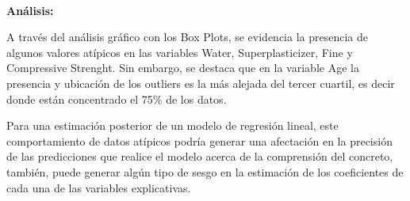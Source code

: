 \documentclass[11pt]{article}
\begin{document}
    \begin{center}
    \end{center}
    { \hspace*{\fill} \\}
    
    \textbf{Análisis:}

A través del análisis gráfico con los Box Plots, se evidencia la
presencia de algunos valores atípicos en las variables Water,
Superplasticizer, Fine y Compressive Strenght. Sin embargo, se destaca
que en la variable Age la presencia y ubicación de los outliers es la
más alejada del tercer cuartil, es decir donde están concentrado el 75\%
de los datos.

Para una estimación posterior de un modelo de regresión lineal, este
comportamiento de datos atípicos podría generar una afectación en la
precisión de las predicciones que realice el modelo acerca de la
comprensión del concreto, también, puede generar algún tipo de sesgo en
la estimación de los coeficientes de cada una de las variables
explicativas.
\end{document}
